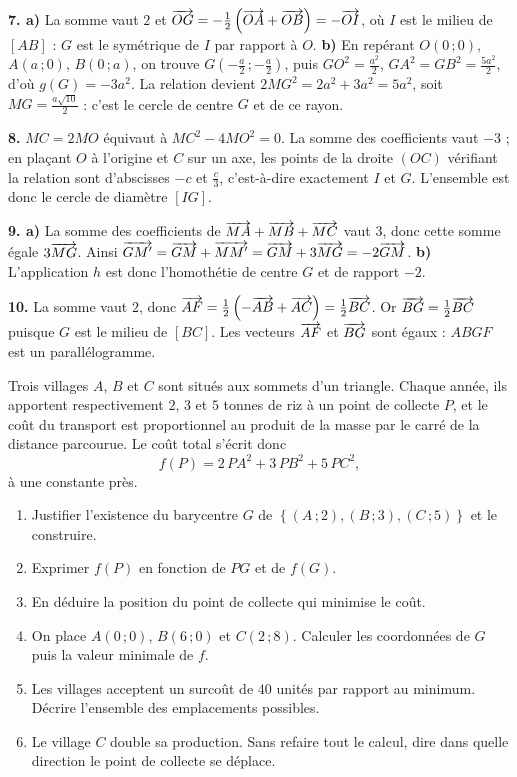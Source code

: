 \begin{corrige}[annales]
\textbf{7. a)} La somme vaut $2$ et
$\overrightarrow{OG} = -\frac12\left(\overrightarrow{OA}+\overrightarrow{OB}\right) = -\overrightarrow{OI}$, où $I$
est le milieu de $[AB]$ : $G$ est le symétrique de $I$ par rapport à $O$.
\textbf{b)} En repérant $O(0\,;0)$, $A(a\,;0)$, $B(0\,;a)$, on trouve
$G\left(-\frac a2\,;-\frac a2\right)$, puis $GO^{2} = \frac{a^{2}}{2}$,
$GA^{2} = GB^{2} = \frac{5a^{2}}{2}$, d'où $g(G) = -3a^{2}$. La relation
devient $2MG^{2} = 2a^{2}+3a^{2} = 5a^{2}$, soit
$MG = \frac{a\sqrt{10}}{2}$ : c'est le cercle de centre $G$ et de ce rayon.

\textbf{8.} $MC = 2MO$ équivaut à $MC^{2}-4MO^{2} = 0$. La somme des
coefficients vaut $-3$ ; en plaçant $O$ à l'origine et $C$ sur un axe, les
points de la droite $(OC)$ vérifiant la relation sont d'abscisses $-c$ et
$\frac c3$, c'est-à-dire exactement $I$ et $G$. L'ensemble est donc le cercle
de diamètre $[IG]$.

\textbf{9. a)} La somme des coefficients de $\overrightarrow{MA}+\overrightarrow{MB}+\overrightarrow{MC}$
vaut $3$, donc cette somme égale $3\overrightarrow{MG}$. Ainsi
$\overrightarrow{GM'} = \overrightarrow{GM}+\overrightarrow{MM'} = \overrightarrow{GM}+3\overrightarrow{MG} = -2\overrightarrow{GM}$.
\textbf{b)} L'application $h$ est donc l'homothétie de centre $G$ et de
rapport $-2$.

\textbf{10.} La somme vaut $2$, donc
$\overrightarrow{AF} = \frac12\left(-\overrightarrow{AB}+\overrightarrow{AC}\right) = \frac12\overrightarrow{BC}$. Or
$\overrightarrow{BG} = \frac12\overrightarrow{BC}$ puisque $G$ est le milieu de $[BC]$. Les
vecteurs $\overrightarrow{AF}$ et $\overrightarrow{BG}$ sont égaux : $ABGF$ est un
parallélogramme.
\end{corrige}

\begin{jecherche}
Trois villages $A$, $B$ et $C$ sont situés aux sommets d'un triangle. Chaque
année, ils apportent respectivement $2$, $3$ et $5$ tonnes de riz à un point
de collecte $P$, et le coût du transport est proportionnel au produit de la
masse par le carré de la distance parcourue. Le coût total s'écrit donc
\[
  f(P) = 2\,PA^{2}+3\,PB^{2}+5\,PC^{2},
\]
à une constante près.

\begin{enumerate}[label=\textbf{\arabic*.}, leftmargin=*, itemsep=0.3em]
  \item Justifier l'existence du barycentre $G$ de
        $\left\{(A\,;2),(B\,;3),(C\,;5)\right\}$ et le construire.
  \item Exprimer $f(P)$ en fonction de $PG$ et de $f(G)$.
  \item En déduire la position du point de collecte qui minimise le coût.
  \item On place $A(0\,;0)$, $B(6\,;0)$ et $C(2\,;8)$. Calculer les
        coordonnées de $G$ puis la valeur minimale de $f$.
  \item Les villages acceptent un surcoût de $40$ unités par rapport au
        minimum. Décrire l'ensemble des emplacements possibles.
  \item Le village $C$ double sa production. Sans refaire tout le calcul, dire
        dans quelle direction le point de collecte se déplace.
\end{enumerate}
\end{jecherche}

